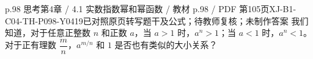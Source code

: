 \par\noindent\begin{minipage}{\linewidth}
\begin{bankitem}{p.98 思考}{第4章 / 4.1 实数指数幂和幂函数 / 教材 p.98 / PDF 第105页}{XJ-B1-C04-TH-P098-Y0419}{已对照原页转写题干及公式；待教师复核；未制作答案}
我们知道，对于任意正整数 $n$ 和正数 $a$，当 $a>1$ 时，$a^n>1$；当 $a<1$ 时，$a^n<1$。对于正有理数 $\dfrac mn$，$a^{m/n}$ 和 $1$ 是否也有类似的大小关系？
\end{bankitem}
\end{minipage}\par\medskip
